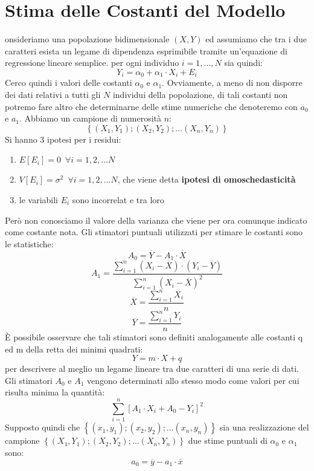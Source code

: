 \documentclass[a4paper,12pt, oneside]{book}
\begin{document}
\section{Stima delle Costanti del Modello}
onsideriamo una popolazione bidimensionale $(X,Y)$ ed assumiamo che tra i due
caratteri esista un legame di dipendenza esprimibile tramite un’equazione di
regressione lineare semplice. per ogni individuo $i=1,...,N$ sia quindi:
\[Y_{i}=\alpha_{0}+\alpha_{1} \cdot X_{i}+E_{i}\]
Cerco quindi i valori delle costanti $\alpha_0$ e $\alpha_1$. Ovviamente, a meno di non disporre dei dati relativi a tutti gli $N$ individui della
popolazione, di tali costanti non potremo fare altro che determinarne delle stime
numeriche che denoteremo con $a_0$ e $a_1$. Abbiamo un campione di numerosità $n$:
\[\left\{\left(X_{1}, Y_{1}\right) ;\left(X_{2}, Y_{2}\right) ; \ldots\left(X_{n}, Y_{n}\right)\right\}\]
Si hanno 3 ipotesi per i residui:
\begin{enumerate}
\item $E[E_i]=0\,\,\,\forall i=1,2,...N$
\item $V[E_i]=\sigma^2\,\,\,\forall i=1,2,...N$, che viene detta \textbf{ipotesi di omoschedasticità}
\item le variabili $E_i$ sono incorrelat e tra loro
\end{enumerate}
Però non conosciamo il valore della varianza che viene per ora comunque indicato come costante nota.
Gli stimatori puntuali utilizzati per stimare le costanti sono le statistiche:
\[A_{0}=\overline{Y}-A_{1} \cdot \overline{X}\]
\[A_{1}=\frac{\sum_{i=1}^{n}\left(X_{i}-\overline{X}\right) \cdot\left(Y_{i}-\overline{Y}\right)}{\sum_{i=1}^{n}\left(X_{i}-\overline{X}\right)^{2}}\]
\[\overline{X}=\frac{\sum_{i=1}^{n} X_{i}}{n}\]
\[\overline{Y}=\frac{\sum_{i=1}^{n} Y_{i}}{n}\]
È possibile osservare che tali stimatori sono definiti analogamente alle costanti q ed
m della retta dei minimi quadrati:
\[Y=m \cdot X+q\]
per descrivere al meglio un legame lineare tra due caratteri di una serie di dati.\\
Gli stimatori $A_0$ e $A_1$ vengono determinati allo stesso modo come valori per
cui risulta minima la quantità:
\[\sum_{i=1}^{n}\left[A_{1} \cdot X_{i}+A_{0}-Y_{i}\right]^{2}\]
Supposto quindi che $\left\{\left(x_{1}, y_{1}\right) ;\left(x_{2}, y_{2}\right) ; \ldots\left(x_{n}, y_{n}\right)\right\}$ sia una realizzazione del campione $\left\{\left(X_{1}, Y_{1}\right) ;\left(X_{2}, Y_{2}\right) ; \ldots\left(X_{n}, Y_{n}\right)\right\}$ due stime puntuali di $\alpha_0$ e $\alpha_1$ sono:
\[a_{0}=\overline{y}-a_{1} \cdot \overline{x}\]
\end{document}
